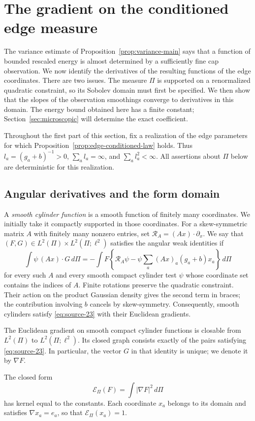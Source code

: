 \section{The gradient on the conditioned edge measure}
\label{sec:gradient}

The variance estimate of Proposition~\ref{prop:variance-main} says that a
function of bounded rescaled energy is almost determined by a sufficiently
fine cap observation. We now identify the derivatives of the resulting
functions of the edge coordinates. There are two issues. The measure
$\Pi$ is supported on a renormalized quadratic constraint, so its Sobolev
domain must first be specified. We then show that the slopes of the
observation smoothings converge to derivatives in this domain. The energy
bound obtained here has a finite constant; Section~\ref{sec:microscopic}
will determine the exact coefficient.

Throughout the first part of this section, fix a realization of the edge
parameters for which Proposition~\ref{prop:edge-conditioned-law} holds.
Thus $l_a=(g_a+b)^{-1}>0$, $\sum_a l_a=\infty$, and
$\sum_a l_a^2<\infty$. All assertions about $\Pi$ below are deterministic
for this realization.

\subsection{Angular derivatives and the form domain}

A \emph{smooth cylinder function} is a smooth function of finitely many
coordinates. We initially take it compactly supported in those coordinates.
For a skew-symmetric matrix $A$ with finitely many nonzero entries, set
$\mathcal R_A=(Ax)\cdot\partial_x$. We say that
$(F,G)\in L^2(\Pi)\times L^2(\Pi;\ell^2)$ satisfies the angular weak
identities if
\begin{equation}
 \int \psi\,(Ax)\cdot G\,d\Pi
 =-\int F\left\{\mathcal R_A\psi
       -\psi\sum_a (Ax)_a(g_a+b)x_a\right\}\,d\Pi
 \label{eq:source-23}
\end{equation}
for every such $A$ and every smooth compact cylinder test $\psi$ whose
coordinate set contains the indices of $A$. Finite rotations preserve the
quadratic constraint. Their action on the product Gaussian density gives
the second term in braces; the contribution involving $b$ cancels by
skew-symmetry. Consequently, smooth cylinders satisfy
\eqref{eq:source-23} with their Euclidean gradients.

\begin{proposition}
\label{prop:gradient-domain}
The Euclidean gradient on smooth compact cylinder functions is closable
from $L^2(\Pi)$ to $L^2(\Pi;\ell^2)$. Its closed graph consists exactly
of the pairs satisfying \eqref{eq:source-23}. In particular, the vector
$G$ in that identity is unique; we denote it by $\nabla F$.

The closed form
\[
 \mathcal E_\Pi(F)=\int|\nabla F|^2\,d\Pi
\]
has kernel equal to the constants. Each coordinate $x_a$ belongs to its
domain and satisfies $\nabla x_a=e_a$, so that
$\mathcal E_\Pi(x_a)=1$.
\end{proposition}

